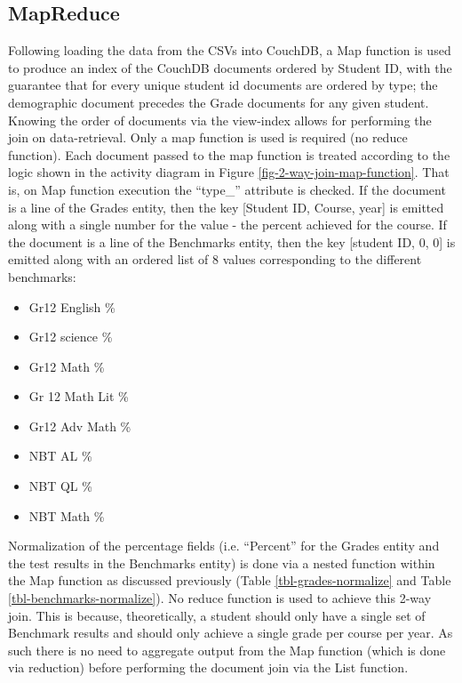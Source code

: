 \subsection{MapReduce}
Following loading the data from the CSVs into CouchDB, a Map function is used to produce an index of the CouchDB documents ordered by Student ID, with the guarantee that for every unique student id documents are ordered by type; the demographic document precedes the Grade documents for any given student. Knowing the order of documents via the view-index allows for performing the join on data-retrieval. Only a map function is used is required (no reduce function). Each document passed to the map function is treated according to the logic shown in the activity diagram in Figure \ref{fig-2-way-join-map-function}. That is, on Map function execution the ``type\_'' attribute is checked. If the document is a line of the Grades entity, then the key [Student ID, Course, year] is emitted along with a single number for the value - the percent achieved for the course. If the document is a line of the Benchmarks entity, then the key [student ID, 0, 0] is emitted along with an ordered list of 8 values corresponding to the different benchmarks:

\begin{itemize}
    \item Gr12 English \%
    \item Gr12 science \%
    \item Gr12 Math \%
    \item Gr 12 Math Lit \%
    \item Gr12 Adv Math \%
    \item NBT AL \%
    \item NBT QL \%
    \item NBT Math \%
\end{itemize}

Normalization of the percentage fields (i.e. ``Percent'' for the Grades entity and the test results in the Benchmarks entity) is done via a nested function within the Map function as discussed previously (Table \ref{tbl-grades-normalize} and Table \ref{tbl-benchmarks-normalize}). No reduce function is used to achieve this 2-way join. This is because, theoretically, a student should only have a single set of Benchmark results and should only achieve a single grade per course per year. As such there is no need to aggregate output from the Map function (which is done via reduction) before performing the document join via the List function.

